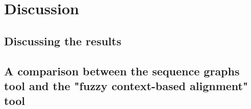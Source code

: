 \documentclass[thesis.tex]{subfiles}
\begin{document}
\chapter{Discussion}
\section{Discussing the results}
\section{A comparison between the sequence graphs tool and the "fuzzy context-based alignment" tool}
\end{document}
